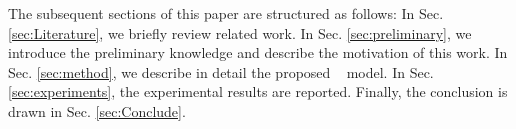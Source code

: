 


The subsequent sections of this paper are structured as follows:
In Sec. \ref{sec:Literature}, we briefly review related work. 
In Sec. \ref{sec:preliminary}, we introduce the preliminary knowledge and describe the motivation of this work.
In Sec. \ref{sec:method}, we describe in detail the proposed \alg~ model. 
In Sec. \ref{sec:experiments}, the experimental results are reported. 
Finally, the conclusion is drawn in Sec. \ref{sec:Conclude}.


